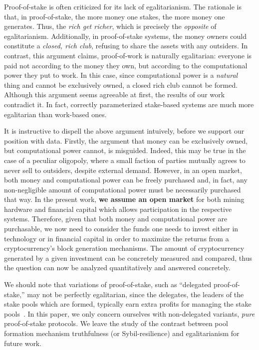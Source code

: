 
Proof-of-stake is often criticized for its lack of egalitarianism. The
rationale is that, in proof-of-stake, the more money one stakes, the more money
one generates. Thus, the \emph{rich get richer}, which is precisely the
\emph{opposite} of egalitarianism. Additionally, in proof-of-stake systems, the
money owners could constitute a \emph{closed, rich club}, refusing to share the
assets with any outsiders.  In contrast, this argument claims, proof-of-work is
naturally egalitarian: everyone is paid not according to the money they own,
but according to the computational power they put to work. In this case, since
computational power is a \emph{natural} thing and cannot be exclusively owned,
a closed rich club cannot be formed.
Although this argument seems agreeable at first, the results of our work contradict it.
In fact, correctly parameterized stake-based systems are much more egalitarian than work-based ones.

It is instructive to dispell the above argument intuively, before we support
our position with data. Firstly, the argument that money can be exclusively
owned, but computational power cannot, is misguided. Indeed, this may be true
in the case of a peculiar oligopoly, where a small faction of parties mutually
agrees to never sell to outsiders, despite external demand. However, in an open
market, both money and computational power can be freely purchased and, in
fact, any non-negligible amount of computational power must be necessarily
purchased that way.
In the present work, \textbf{we assume an open market} for both mining hardware
and financial capital which allows participation in the respective systems.
Therefore, given that both money and computational power
are purchasable, we now need to consider the funds one needs to invest either in
technology or in financial capital in order to maximize the returns from a
cryptocurrency's block generation mechanisms. The amount of cryptocurrency
generated by a given investment can be concretely measured and compared, thus
the question can now be analyzed quantitatively and answered concretely.

We should
note that variations of proof-of-stake, such as ``delegated proof-of-stake,''
may not be perfectly egalitarian, since the delegates, \ie the leaders of
the stake pools which are formed, typically earn extra profits for managing the
stake pools~\cite{bkks2018}. In this paper, we only concern
ourselves with non-delegated variants, \ie \emph{pure} proof-of-stake protocols.
We leave the study of the contrast between pool formation mechanism truthfulness
(or Sybil-resilience) and egalitarianism for future work.

